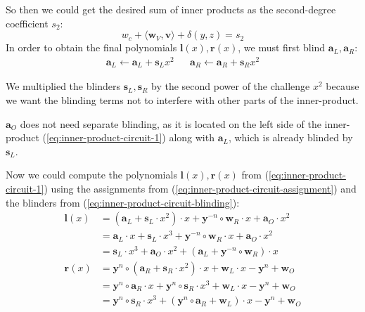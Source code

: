 \documentclass[../../book.tex]{subfiles}
\begin{document}
So then we could get the desired sum of inner products as the second-degree coefficient $s_2$:
$$ w_c + \langle \mathbf{w}_V, \mathbf{v} \rangle + \delta(y, z) = s_2$$
In order to obtain the final polynomials $\mathbf{l}(x), \mathbf{r}(x)$, we must first blind $\mathbf{a}_L, \mathbf{a}_R$:
\begin{equation}
    \begin{aligned}
    \mathbf{a}_L \gets \mathbf{a}_L + \mathbf{s}_Lx^2 && \mathbf{a}_R \gets \mathbf{a}_R + \mathbf{s}_Rx^2
    \end{aligned}
    \label{eq:inner-product-circuit-blinding}
\end{equation}
\begin{remark}
    We multiplied the blinders $\mathbf{s}_L, \mathbf{s}_R$ by the second power of the challenge $x^2$ because we want the blinding terms not to interfere with other parts of the inner-product.

    $\mathbf{a}_O$ does not need separate blinding, as it is located on the left side of the inner-product (\ref{eq:inner-product-circuit-1}) along with $\mathbf{a}_L$, which is already blinded by $\mathbf{s}_L$.
\end{remark}

Now we could compute the polynomials $\mathbf{l}(x), \mathbf{r}(x)$ from (\ref{eq:inner-product-circuit-1}) using the assignments from (\ref{eq:inner-product-circuit-assignment}) and the blinders from (\ref{eq:inner-product-circuit-blinding}):
\begin{equation}
    \begin{aligned}
        {\mathbf{l}}(x) &= (\mathbf{a}_L + \mathbf{s}_L \cdot x^2) \cdot x + \mathbf{y}^{-n} \circ \mathbf{w}_R \cdot x + \mathbf{a}_O \cdot x^2 \\
                  &= \mathbf{a}_L \cdot x + \mathbf{s}_L \cdot x^3 + \mathbf{y}^{-n} \circ \mathbf{w}_R \cdot x + \mathbf{a}_O \cdot x^2 \\
                  &= \mathbf{s}_L \cdot x^3 + \mathbf{a}_O \cdot x^2 + (\mathbf{a}_L + \mathbf{y}^{-n} \circ \mathbf{w}_R) \cdot x \\
        {\mathbf{r}}(x) &= \mathbf{y}^n \circ (\mathbf{a}_R + \mathbf{s}_R \cdot x^2) \cdot x + \mathbf{w}_L \cdot x - \mathbf{y}^n + \mathbf{w}_O \\
                  &= \mathbf{y}^n \circ \mathbf{a}_R \cdot x + \mathbf{y}^n \circ \mathbf{s}_R \cdot x^3 + \mathbf{w}_L \cdot x - \mathbf{y}^n + \mathbf{w}_O \\
                  &= \mathbf{y}^n \circ \mathbf{s}_R \cdot x^3 + (\mathbf{y}^n \circ \mathbf{a}_R +  \mathbf{w}_L) \cdot x - \mathbf{y}^n + \mathbf{w}_O
    \end{aligned}
    \label{eq:inner-product-circuit-polynomials}
\end{equation}
\end{document}

